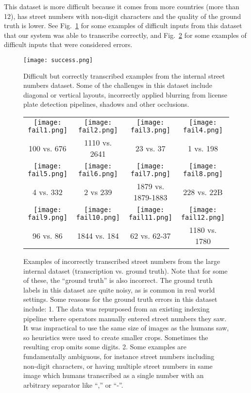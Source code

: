 \documentclass{article} \usepackage{comment}
\begin{document}
This dataset is more difficult because it comes from more countries (more than 12),
has street numbers with non-digit characters and the quality of the ground truth is lower.
See Fig.~\ref{fig:success} for some examples of difficult inputs from this dataset that our
system was able to transcribe correctly, and Fig.~\ref{fig:failure} for some examples of
difficult inputs that were considered errors.
\begin{figure}
\vspace{-2.5mm}
\begin{centering}
\texttt{[image: success.png]}
\caption{Difficult but correctly transcribed examples from the internal street numbers dataset.
Some of the challenges in this dataset include diagonal or vertical layouts, incorrectly
applied blurring from license plate detection pipelines, shadows and other occlusions.
}
\label{fig:success}
\end{centering}
\end{figure}

\begin{figure}
\begin{centering}
\begin{tabular}{cccc}
\texttt{[image: fail1.png]} & \texttt{[image: fail2.png]}
& \texttt{[image: fail3.png]} & \texttt{[image: fail4.png]} \\
100 vs. 676& 1110 vs. 2641 & 23 vs. 37 & 1 vs. 198 \\
\texttt{[image: fail5.png]} & \texttt{[image: fail6.png]}
& \texttt{[image: fail7.png]} & \texttt{[image: fail8.png]} \\
4 vs. 332 & 2 vs 239 & 1879 vs. 1879-1883 & 228 vs. 22B \\
\texttt{[image: fail9.png]} & \texttt{[image: fail10.png]}
& \texttt{[image: fail11.png]} & \texttt{[image: fail12.png]} \\
96 vs. 86 & 1844 vs. 184 & 62 vs. 62-37 & 1180 vs. 1780 \\
\end{tabular}
\caption{
Examples of incorrectly transcribed street numbers from the large internal dataset (transcription vs. ground truth). Note that for
some of these, the ``ground truth'' is also incorrect.
The ground truth labels in this dataset are quite noisy, as is common in real world settings.
Some reasons for the ground truth errors in this dataset include:
1. The data was repurposed from an existing indexing pipeline where operators manually entered street
numbers they saw. It was impractical to use the same size of images as the humans saw, so heuristics
were used to create smaller crops. Sometimes the resulting crop omits some digits.
2. Some examples are fundamentally ambiguous, for instance street numbers including non-digit characters, or having multiple street numbers in same image which humans transcribed as a single number with an arbitrary separator like ``,'' or ``-''.
}
\label{fig:failure}
\end{centering}
\end{figure}
\end{document}
